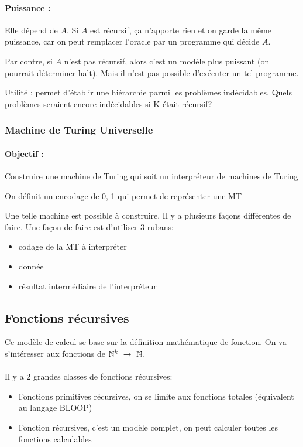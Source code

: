 \paragraph{Puissance :} Elle dépend de $A$. Si $A$ est récursif, ça n'apporte rien et
  on garde la même puissance, car on peut remplacer l'oracle par un programme qui décide   
  $A$.
  
Par contre, si $A$ n'est pas récursif, alors c'est un modèle plus 
puissant (on pourrait déterminer halt). Mais il n’est pas possible d'exécuter un tel programme. 

\begin{myrem}
	Utilité : permet d'établir une hiérarchie parmi les problèmes 
	indécidables. Quels problèmes seraient encore
	indécidables si K était récursif?
\end{myrem}

\subsubsection{Machine de Turing Universelle}

\paragraph{Objectif :} Construire une machine de Turing qui soit un 
interpréteur de machines de Turing

\begin{myrem}
	On définit un encodage de 0, 1 qui permet de représenter une MT
\end{myrem}

Une telle machine est possible à construire. Il y a plusieurs façons différentes de faire. Une façon de faire est d'utiliser 3 rubans:
\begin{itemize}
	\item codage de la MT à interpréter
	\item donnée
	\item résultat intermédiaire de l'interpréteur
\end{itemize}

\subsection{Fonctions récursives}
\label{sub:fonction_r_cursives}
Ce modèle de calcul se base sur la définition mathématique de fonction. On va 
s'intéresser aux fonctions de $\mathbb{N}^k \ \rightarrow \ \mathbb{N}$.

\paragraph{} Il y a 2 grandes classes de fonctions récursives: 
\begin{itemize}
	\item Fonctions primitives récursives, on se limite aux fonctions totales 
		(équivalent au langage BLOOP)
	\item Fonction récursives, c'est un modèle complet, on peut calculer 
		toutes les fonctions calculables 
\end{itemize}

